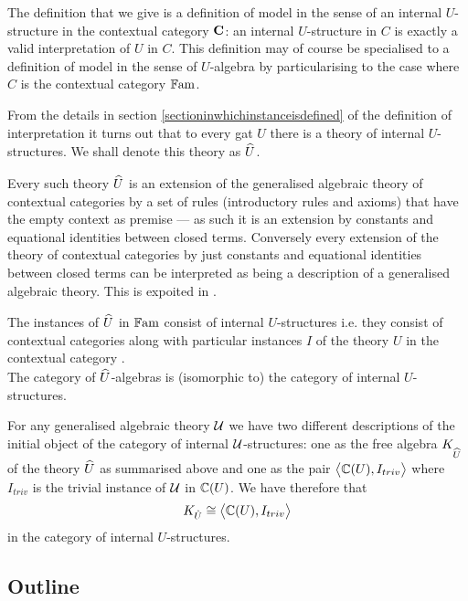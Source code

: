 {The definition that we give is a definition  of model in the sense of an internal $U$-structure in the contextual category $\catc$:
an internal $U$-structure in $C$ is exactly 
a valid interpretation of $U$ in $C$. This definition may of course be specialised to a  definition of model in the sense of
$U$-algebra by particularising to the case where $C$ is the contextual category $\Fam$.


From the details in
section \ref{sectioninwhichinstanceisdefined} 
of the definition of interpretation
it turns out that 
to every gat $U$ there is a theory of internal $U$-structures. We shall denote this theory as $\hatU$.

Every such theory $\hatU$ is an extension of the generalised algebraic theory of contextual categories
by a set of rules (introductory rules and axioms) that have  the empty context as premise
 --- as such it is an extension
by constants and equational identities between closed terms.  Conversely every  extension of
the theory of contextual categories by just constants and equational identities between closed terms can be interpreted as being a description of a generalised algebraic theory. This is expoited in \cite{BCDEpaper}.


The instances of $\hatU$  in $\Fam$ consist of  internal $U$-structures  i.e. they consist of contextual categories \catcw along with particular instances $I$ of
the theory $U$ in the contextual category \catc. \\
The category of $\hatU$-algebras is (isomorphic to) the category of internal $U$-structures.


\label{termmodelEQfreealgebra}For any generalised algebraic theory $\gat[U]$ we have two different 
 descriptions of the initial object of the category of internal $\gatU$-structures:
one as the free algebra $K_{\hatU}$ of the theory $\hatU$ as summarised above and one  as the pair $\bigtuple{\CofU, I_{triv}}$ 
where $I_{triv}$ is the trivial instance of $\gatU$ in $\CofU$. We have therefore that
\begin{equation*}
K_{\hat{U}} \cong \bigtuple{\CofU, I_{triv}}
\end{equation*}
in the category of internal $U$-structures.


\subsection{Outline}

}
